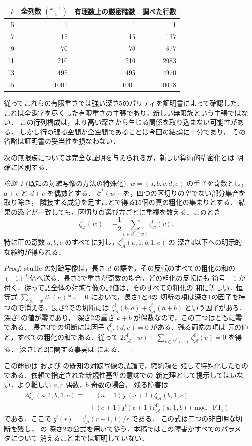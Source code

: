 \documentclass[12pt]{amsart}
\theoremstyle{definition}
\theoremstyle{remark}
\numberwithin{equation}{section}
\newcommand{\Fil}{\operatorname{Fil}}
\newcommand{\zf}{\zeta_{\mathcal A}^{\mathrm f}}
\newtheorem{jprop}[thm]{命題}
\theoremstyle{definition}
\theoremstyle{remark}
\begin{document}
\begin{center}
\begin{tabular}{rrrr}
\toprule
$k$&全列数 $\binom{k-1}{4}$&有理数上の厳密階数&調べた行数\\
\midrule
5&1&1&1\\7&15&15&137\\9&70&70&677\\
11&210&210&2083\\13&495&495&4970\\15&1001&1001&10018\\
\bottomrule
\end{tabular}
\end{center}
従ってこれらの有限重さでは強い深さ5のパリティを証明書によって確認した．
これは全添字を尽くした有限重さの主張であり，新しい無限族という主張ではない．
この行列構成は，より高い深さから生じる関係を取り込まない可能性がある．
しかし行の張る空間が全空間であることは今回の結論に十分であり，
その省略は証明書の妥当性を損なわない．

次の無限族については完全な証明を与えられるが，新しい算術的精密化とは
明確に区別する．
\begin{jprop}[既知の対蹠写像の方法の特殊化]\label{ja:depthfamily}
$w=(a,b,c,d,e)$ の重さを奇数とし，$a+b$ と $d+e$ を偶数とする．
$\mathcal C^*(w)$ を，四つの区切りの空でない部分集合を取り除き，
隣接する成分を足すことで得る15個の真の粗化の集まりとする．
結果の添字が一致しても，区切りの選び方ごとに重複を数える．このとき
\[
 \zf(w)=-\frac12\sum_{v\in\mathcal C^*(w)}\zf(v).
\]
特に正の奇数 $a,b,c$ のすべてに対し，$\zf(a,1,b,1,c)$ の
深さ4以下への明示的な縮約が得られる．
\end{jprop}
\begin{proof}
stuffle の対蹠写像は，長さ $d$ の語を，その反転のすべての粗化の和の
$(-1)^d$ 倍へ送る．長さ5で重さが奇数の場合，どの粗化の反転にも
符号 $-1$ が付く．従って語全体の対蹠写像の評価は，そのすべての粗化の
和に等しい．恒等式 $\sum_{uv=w}S_*(u)*v=0$ において，長さ1と4の
切断の項は深さ1の因子を持つので消える．長さ2での切断には
$\zf(b,a)+\zf(a+b)$ という因子がある．深さ1の値が零であり，
深さ2の重さ $a+b$ が偶数なので，この二つはともに零である．
長さ3での切断には因子 $\zf(d,e)=0$ がある．残る両端の項は
元の値と，すべての粗化の和である．従って
$2\zf(w)+\sum_{v\in\mathcal C^*(w)}\zf(v)=0$ を得る．
深さ1と2に関する事実は \cite[Proposition 3.3]{jBR} による．
\end{proof}
この命題は \cite[Theorem 4.1]{jBR} および
\cite[\S6, Proposition 6]{jKZ} の既知の対蹠写像の議論で，縮約項を
残して特殊化したものである．依頼で指定された新規性基準の意味での
新定理として提示してはいない．より難しい $a,c$ 偶数，$b$ 奇数の場合，
残る障害は
\[
 \begin{split}
 2\zf(a,1,b,1,c)\equiv{}&-(a+1)\mathfrak z^{\mathrm f}(a+1)
                             \zf(b,1,c)\\
 &+(c+1)\mathfrak z^{\mathrm f}(c+1)\zf(a,1,b)
 \pmod{\Fil_4}
 \end{split}
\]
である．ここで $\mathfrak z^{\mathrm f}(r)=\zf(r-1,1)/r$ である．
この式は二つの非自明な切断を残し，\cite[Proposition 3.3]{jBR} の
深さ2の公式を用いて従う．本稿ではこの障害がすべてのパラメータについて
消えることまでは証明していない．
\end{document}
